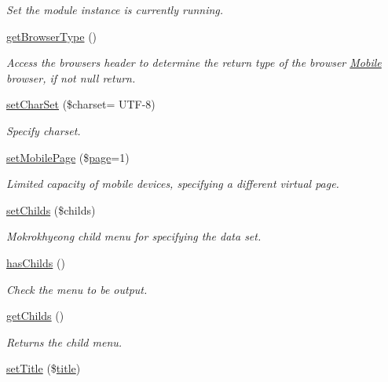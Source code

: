 \begin{DoxyCompactItemize}
\begin{DoxyCompactList}\small\item\em Set the module instance is currently running. \end{DoxyCompactList}\item 
\hyperlink{classmobileXE_a462a4900af63aa2bfbcea2168afbe876}{get\+Browser\+Type} ()
\begin{DoxyCompactList}\small\item\em Access the browser\textquotesingle{}s header to determine the return type of the browser \hyperlink{classMobile}{Mobile} browser, if not null return. \end{DoxyCompactList}\item 
\hyperlink{classmobileXE_ad12dcc0e8a5dd3a507587516e3a62f2a}{set\+Char\+Set} (\$charset= \textquotesingle{}U\+T\+F-\/8\textquotesingle{})
\begin{DoxyCompactList}\small\item\em Specify charset. \end{DoxyCompactList}\item 
\hyperlink{classmobileXE_a462ec879b69ab476662754aec66800dd}{set\+Mobile\+Page} (\$\hyperlink{classpage}{page}=1)
\begin{DoxyCompactList}\small\item\em Limited capacity of mobile devices, specifying a different virtual page. \end{DoxyCompactList}\item 
\hyperlink{classmobileXE_a0ea0dec157552b699d23388b257d22a6}{set\+Childs} (\$childs)
\begin{DoxyCompactList}\small\item\em Mokrokhyeong child menu for specifying the data set. \end{DoxyCompactList}\item 
\hyperlink{classmobileXE_a680f6a6b774bf12be4c67b6a9215f1ea}{has\+Childs} ()
\begin{DoxyCompactList}\small\item\em Check the menu to be output. \end{DoxyCompactList}\item 
\hyperlink{classmobileXE_a650f04e4701a5a1ae2ddceeb0f401166}{get\+Childs} ()
\begin{DoxyCompactList}\small\item\em Returns the child menu. \end{DoxyCompactList}\item 
\hyperlink{classmobileXE_a6ae064d89d2b926d7c96f59257692a01}{set\+Title} (\$\hyperlink{ko_8install_8php_a5b072c5fd1d2228c6ba5cee13cd142e3}{title})

\end{DoxyCompactItemize}
